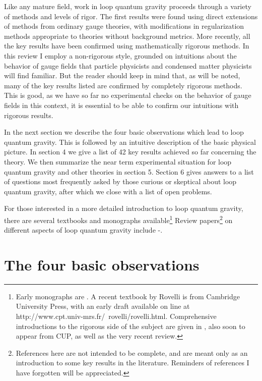 \documentclass[12pt]{article}
\begin{document}
Like any mature field, work in loop quantum gravity proceeds through a variety of methods and 
levels of rigor.  The first results were found using direct extensions of methods from ordinary gauge theories, with modifications in regularization methods appropriate to theories without
background metrics.  More recently, all the key results have been confirmed using 
mathematically rigorous methods\cite{thomas-thesis,abhayjerzy}.  In this review I employ a non-rigorous style, grounded on intuitions about the behavior of gauge fields that particle physicists and condensed matter physicists will find familiar. But the reader should keep in mind that,  as will be noted, many of  the key results listed are confirmed by completely rigorous methods.  This is good, as we have so far no experimental checks on the behavior of gauge fields in this context, it is essential to be able to confirm our intuitions with rigorous results.  

In the next section  we describe the four basic observations which lead to loop quantum
gravity.  This is followed by an intuitive description of the basic physical picture. 
In section 4 we give a list of 42 key results achieved so far concerning the theory. 
 We then 
  summarize the near term experimental situation for loop quantum 
  gravity and other theories in section 5. Section 6 gives answers to a list of
 questions most frequently asked by those curious or skeptical about loop quantum gravity, 
after which we  close with a list of open problems.   
  
  For those interested in a more detailed introduction to loop quantum 
  gravity, there are 
  several textbooks and  monographs  
available\footnote{Early 
  monographs are \cite{abhaybooks,PG-book}. A recent textbook by 
Rovelli\cite{Carlo-book}  is from Cambridge University Press, with an early draft available on 
  line at 
http://www.cpt.univ-mrs.fr/~rovelli/rovelli.html. 
  Comprehensive introductions to the rigorous side of the subject are 
  given in \cite{thomas-thesis}, also soon to appear from CUP, as well as the very recent
review\cite{abhayjerzy}.}   Review papers\footnote{References here are not intended to be complete,
and are meant only as an introduction to some key results in the 
literature.  Reminders of references I have forgotten will be appreciated.}  on 
  different aspects of loop quantum gravity  include \cite{abhayjerzy}-\cite{alejandro-review}.

\section{The four basic observations} 
  
\end{document}
